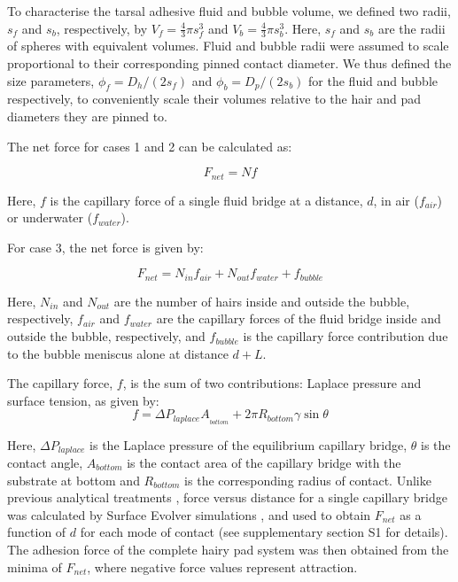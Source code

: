 \documentclass[vruler,JEB]{COB}%
\begin{document}
To characterise the tarsal adhesive fluid and bubble volume, we defined two
radii, $s_{f}$ and $s_{b}$, respectively, by $V_{f}=\frac{4}{3}\pi s_{f}^{3}$
and $V_{b}=\frac{4}{3}\pi s_{b}^{3}$. Here, $s_{f}$ and $s_{b}$
are the radii of spheres with equivalent volumes. Fluid and bubble
radii were assumed to scale proportional to their corresponding pinned
contact diameter. We thus defined the size parameters, $\phi_{f}=D_{h}/(2s_{f})$
and $\phi_{b}=D_{p}/(2s_{b})$ for the fluid and bubble
respectively, to conveniently scale their volumes relative to the
hair and pad diameters they are pinned to.

The net force for cases 1 and 2 can be calculated as:

\begin{equation}
F_{net}=Nf\label{eq:f_air/water}
\end{equation}

Here, $f$ is the capillary force of a single fluid bridge at a distance,
$d$, in air ($f_{air}$) or underwater ($f_{water}$).

For case 3, the net force is given by:

\begin{equation}
F_{net}=N_{in}f_{air}+N_{out}f_{water}+f_{bubble}\label{eq:f_bubble}
\end{equation}

Here, $N_{in}$ and $N_{out}$ are the number of hairs inside and
outside the bubble, respectively, $f_{air}$ and $f_{water}$ are
the capillary forces of the fluid bridge inside and outside the bubble,
respectively, and $f_{bubble}$ is the capillary force contribution
due to the bubble meniscus alone at distance $d+L$. 

The capillary force, $f$, is the sum of two contributions: Laplace pressure and  surface
tension, as given by:
\begin{equation}
f=\varDelta P_{laplace}A_{_{bottom}}+2\pi R_{bottom}\gamma\sin\theta\label{eq:f_bridge}
\end{equation}

Here, $\varDelta P_{laplace}$ is the Laplace pressure of the equilibrium
capillary bridge, $\theta$ is the contact angle, $A_{bottom}$ is the contact area of the capillary
bridge with the substrate at bottom and $R_{bottom}$ is the corresponding
radius of contact. Unlike previous analytical treatments \citep{RN203, RN318}, force versus distance for a single capillary bridge was calculated by Surface
Evolver simulations \citep{RN206, RN93},
and used to obtain $F_{net}$ as a function of $d$ for each mode
of contact  (see supplementary section S1 for details). The adhesion force of the complete hairy pad system was
then obtained from the minima of $F_{net}$, where negative force
values represent attraction.
\end{document}
